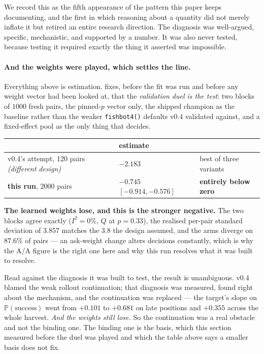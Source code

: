\documentclass[11pt,a4paper]{article}
\newcommand{\Prob}{\ensuremath{\mathbb{P}}}
\begin{document}
We record this as the fifth appearance of the pattern this paper keeps
documenting, and the first in which reasoning about a quantity did not merely
inflate it but retired an entire research direction. The diagnosis was
well-argued, specific, mechanistic, and supported by a number. It was also never
tested, because testing it required exactly the thing it asserted was
impossible.

\paragraph{And the weights were played, which settles the line.} Everything
above is estimation.  fixes,
before the fit was run and before any weight vector had been looked at, that
the \emph{validation duel is the test}: two blocks of $1000$ fresh pairs, the
pinned-$p$ vector only, the shipped champion as the baseline rather than the
weaker \texttt{fishbot4()} defaults v0.4 validated against, and a fixed-effect
pool as the only thing that decides.

\begin{center}
\small
\begin{tabular}{lll}
\toprule
& estimate & \\
\midrule
v0.4's attempt, 120 pairs \emph{(different design)} & $-2.183$ & best of three variants \\
\textbf{this run}, 2000 pairs & $\mathbf{-0.745}$ $[-0.914, -0.576]$ & \textbf{entirely below zero} \\
\bottomrule
\end{tabular}
\end{center}

\textbf{The learned weights lose, and this is the stronger negative.} The two
blocks agree exactly ($I^2 = 0\%$, $Q$ at $p = 0.33$), the realised per-pair
standard deviation of $3.857$ matches the $3.8$ the design assumed, and the arms
diverge on $87.6\%$ of pairs --- an ask-weight change alters decisions
constantly, which is why the A/A figure is the right one here and why this run
resolves what it was built to resolve.

Read against the diagnosis it was built to test, the result is unambiguous.
v0.4 blamed the weak rollout continuation; that diagnosis was measured, found
right about the mechanism, and the continuation was replaced --- the target's
slope on $\Prob(\text{success})$ went from $+0.101$ to $+0.681$ on late
positions and $+0.355$ across the whole harvest. \emph{And the weights still
lose.} So the continuation was a real obstacle and not the binding one. The
binding one is the basis, which this section measured before the duel was
played and which the table above says a smaller basis does not fix.
\end{document}
